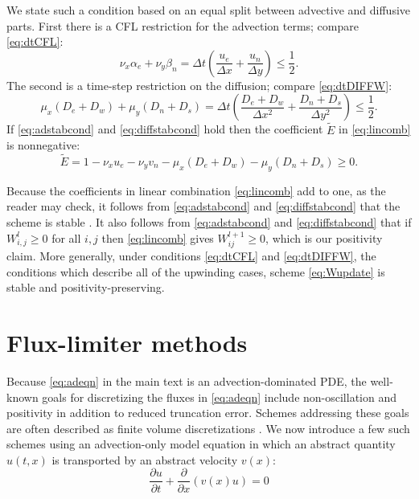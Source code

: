 \documentclass[11pt,final]{amsart}
\newcommand{\ddt}[1]{\ensuremath{\frac{\partial #1}{\partial t}}}
\newcommand{\ddx}[1]{\ensuremath{\frac{\partial #1}{\partial x}}}
\newcommand{\Wlij}{W^l_{i,j}}
\begin{document}
We state such a condition based on an equal split between advective and diffusive parts.  First there is a CFL restriction for the advection terms; compare \eqref{eq:dtCFL}:
\begin{equation}
\nu_x \alpha_e + \nu_y \beta_n = \Delta t \left(\frac{u_e}{\Delta x} + \frac{u_n}{\Delta y}\right) \le \frac{1}{2}. \label{eq:adstabcond}
\end{equation}
The second is a time-step restriction on the diffusion; compare \eqref{eq:dtDIFFW}:
\begin{equation}
\mu_x (D_e + D_w) + \mu_y (D_n + D_s) = \Delta t \left(\frac{D_e + D_w}{\Delta x^2} + \frac{D_n + D_s}{\Delta y^2}\right) \le \frac{1}{2}. \label{eq:diffstabcond}
\end{equation}
If \eqref{eq:adstabcond} and \eqref{eq:diffstabcond} hold then the coefficient $\tilde E$ in \eqref{eq:lincomb} is nonnegative:
	$$\tilde E = 1 - \nu_x u_e - \nu_y v_n - \mu_x (D_e + D_w) - \mu_y (D_n + D_s) \ge 0.$$

Because the coefficients in linear combination \eqref{eq:lincomb} add to one, as the reader may check, it follows  from \eqref{eq:adstabcond} and \eqref{eq:diffstabcond} that the scheme is stable \citep{MortonMayers}.  It also follows from \eqref{eq:adstabcond} and \eqref{eq:diffstabcond} that if $\Wlij\ge 0$ for all $i,j$ then \eqref{eq:lincomb} gives $W_{ij}^{l+1}\ge 0$, which is our positivity claim.  More generally, under conditions \eqref{eq:dtCFL} and \eqref{eq:dtDIFFW}, the conditions which describe all of the upwinding cases, scheme \eqref{eq:Wupdate} is stable and positivity-preserving.


\section{Flux-limiter methods} \label{app:fluxlimiters}

Because \eqref{eq:adeqn} in the main text is an advection-dominated PDE, the well-known goals for discretizing the fluxes in \eqref{eq:adeqn} include non-oscillation and positivity \citep{HundsdorferVerwer2010} in addition to reduced truncation error.  Schemes addressing these goals are often described as finite volume discretizations \citep{LeVeque}.  We now introduce a few such schemes using an advection-only model equation in which an abstract quantity $u(t,x)$ is transported by an abstract velocity $v(x)$:
\begin{equation} \label{eq:modeladvect}
\ddt{u} + \ddx{}\left(v(x) u\right) = 0
\end{equation}
\end{document}

